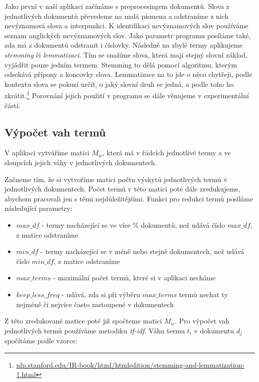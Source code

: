 \documentclass[11pt]{scrartcl} %
\begin{document}
Jako první v naší aplikaci začínáme s preprocesingem dokumentů. Slova z jednotlivých dokumentů převedeme na malá písmena a odstraníme z nich nevýznamová slova a interpunkci. K identifikaci nevýznamových slov používáme seznam anglických nevýznamových slov. Jako parametr programu posíláme také, zda má z dokumentů odstranit i číslovky. Následně na zbylé termy aplikujeme \emph{stemming} či \emph{lemmatizaci}. Tím se snažíme slova, která mají stejný slovní základ, vyjádřit pouze jedním termem. Stemming to dělá pomocí algoritmu, kterým odsekává přípony a koncovky slova. Lemmatizace na to jde o něco chytřeji, podle kontextu slova se pokusí určit, o jaký slovní druh se jedná, a podle toho ho zkrátit.\footnote{\url{nlp.stanford.edu/IR-book/html/htmledition/stemming-and-lemmatization-1.html}} Porovnání jejich použití v programu se dále věnujeme v experimentální části.

\subsection{Výpočet vah termů}\label{subsec:term_weights}
V aplikaci vytváříme matici $M_w$, která má v řádcích jednotlivé termy a ve sloupcích jejich váhy v jednotlivých dokumentech.

\bigskip 

Začneme tím, že si vytvoříme matici počtu výskytů jednotlivých termů v jednotlivých dokumentech. Počet termů v této matici poté dále zredukujeme, abychom pracovali jen s těmi nejdůležitějšími. Funkci pro redukci termů posíláme následující parametry:
\begin{itemize}
	\item $\mathit{max\_df}$ - termy nacházející se ve více \% dokumentů, než udává číslo $\mathit{max\_df}$, z matice odstraníme
	\item $\mathit{min\_df}$ - termy nacházející se v méně nebo stejně dokumentech, než udává číslo $\mathit{min\_df}$, z matice odstraníme
	\item $\mathit{max\_terms}$ - maximální počet termů, které si v aplikaci necháme
	\item $\mathit{keep\_less\_freq}$ - udává, zda si při výběru $\mathit{max\_terms}$ termů nechat ty nejméně či nejvíce často zastoupené v dokumentech  
\end{itemize}

\bigskip

Z této zredukované matice poté již spočteme matici $M_w$. Pro výpočet vah jednotlivých termů používáme metodiku \emph{tf-idf}. Váhu termu $t_i$ v dokumentu $d_j$ spočítáme podle vzorce:
\end{document}
